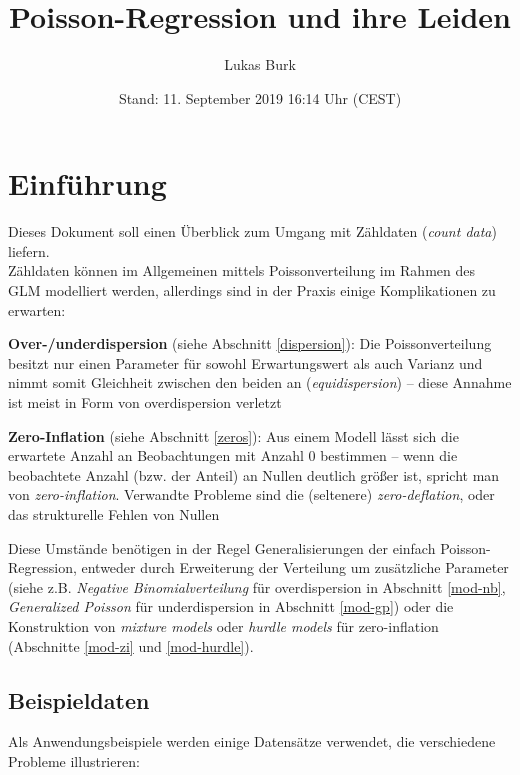 \documentclass[ngerman,a4paper,]{scrartcl}
\title{Poisson-Regression und ihre Leiden}
\author{Lukas Burk}
\date{Stand: 11. September 2019 16:14 Uhr (CEST)}
\theoremstyle{definition}
\theoremstyle{definition}
\theoremstyle{definition}
\theoremstyle{remark}
\begin{document}
\maketitle

{
\hypersetup{linkcolor=black}
\setcounter{tocdepth}{2}
\tableofcontents
}
\hypertarget{einfuhrung}{%
\section{Einführung}\label{einfuhrung}}

Dieses Dokument soll einen Überblick zum Umgang mit Zähldaten (\emph{count data}) liefern.\\
Zähldaten können im Allgemeinen mittels Poissonverteilung im Rahmen des GLM modelliert werden, allerdings sind in der Praxis einige Komplikationen zu erwarten:

\textbf{Over-/underdispersion} (siehe Abschnitt \ref{dispersion}): Die Poissonverteilung besitzt nur einen Parameter für sowohl Erwartungswert als auch Varianz und nimmt somit Gleichheit zwischen den beiden an (\emph{equidispersion}) -- diese Annahme ist meist in Form von overdispersion verletzt

\textbf{Zero-Inflation} (siehe Abschnitt \ref{zeros}): Aus einem Modell lässt sich die erwartete Anzahl an Beobachtungen mit Anzahl \(0\) bestimmen -- wenn die beobachtete Anzahl (bzw. der Anteil) an Nullen deutlich größer ist, spricht man von \emph{zero-inflation}. Verwandte Probleme sind die (seltenere) \emph{zero-deflation}, oder das strukturelle Fehlen von Nullen

Diese Umstände benötigen in der Regel Generalisierungen der einfach Poisson-Regression, entweder durch Erweiterung der Verteilung um zusätzliche Parameter (siehe z.B. \emph{Negative Binomialverteilung} für overdispersion in Abschnitt \ref{mod-nb}, \emph{Generalized Poisson} für underdispersion in Abschnitt \ref{mod-gp}) oder die Konstruktion von \emph{mixture models} oder \emph{hurdle models} für zero-inflation (Abschnitte \ref{mod-zi} und \ref{mod-hurdle}).

\hypertarget{data}{%
\subsection{Beispieldaten}\label{data}}

Als Anwendungsbeispiele werden einige Datensätze verwendet, die verschiedene Probleme illustrieren:
\end{document}
